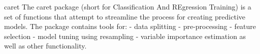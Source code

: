 
caret
The caret package (short for Classification And REgression Training) is a set of functions that attempt to streamline the process for creating predictive models. The package contains tools for:
- data splitting
- pre-processing
- feature selection
- model tuning using resampling
- variable importance estimation
as well as other functionality.

